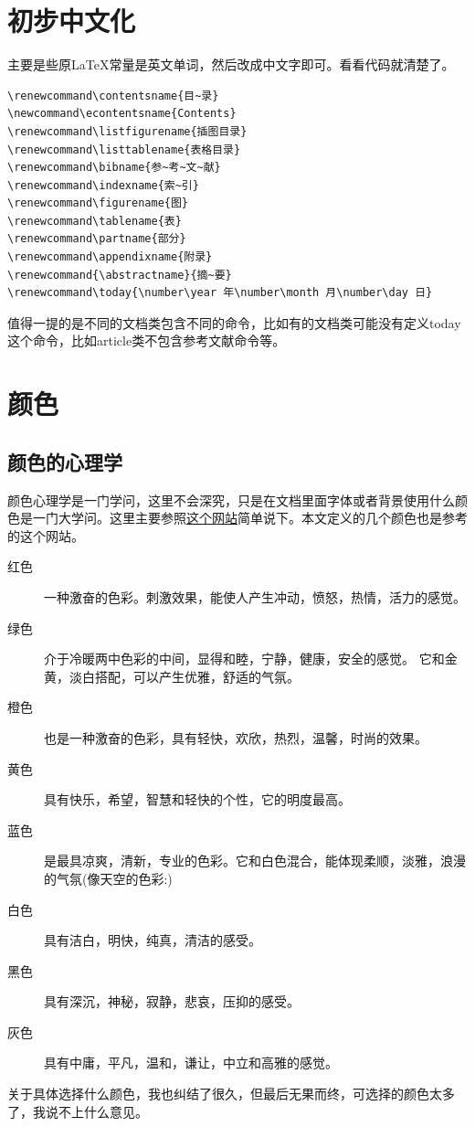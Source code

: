 \documentclass[12pt,oneside]{book}
\begin{document}
\begin{common-format}
\section{初步中文化}
主要是些原\LaTeX 常量是英文单词，然后改成中文字即可。看看代码就清楚了。
\begin{Verbatim}
\renewcommand\contentsname{目~录}
\newcommand\econtentsname{Contents}
\renewcommand\listfigurename{插图目录}
\renewcommand\listtablename{表格目录}
\renewcommand\bibname{参~考~文~献}
\renewcommand\indexname{索~引}
\renewcommand\figurename{图}
\renewcommand\tablename{表}
\renewcommand\partname{部分}
\renewcommand\appendixname{附录}
\renewcommand{\abstractname}{摘~要}
\renewcommand\today{\number\year 年\number\month 月\number\day 日}
\end{Verbatim}

值得一提的是不同的文档类包含不同的命令，比如有的文档类可能没有定义today这个命令，比如article类不包含参考文献命令等。



\section{颜色}
\label{sec:颜色}
\subsection{颜色的心理学}
颜色心理学是一门学问，这里不会深究，只是在文档里面字体或者背景使用什么颜色是一门大学问。这里主要参照\href{http://www.jb51.net/article/8216.htm}{这个网站}简单说下。本文定义的几个颜色也是参考的这个网站。

\begin{description}
\item[红色] 一种激奋的色彩。刺激效果，能使人产生冲动，愤怒，热情，活力的感觉。
\item[绿色] 介于冷暖两中色彩的中间，显得和睦，宁静，健康，安全的感觉。 它和金黄，淡白搭配，可以产生优雅，舒适的气氛。
\item[橙色] 也是一种激奋的色彩，具有轻快，欢欣，热烈，温馨，时尚的效果。
\item[黄色] 具有快乐，希望，智慧和轻快的个性，它的明度最高。 
\item[蓝色] 是最具凉爽，清新，专业的色彩。它和白色混合，能体现柔顺，淡雅，浪漫的气氛(像天空的色彩:) 
\item[白色] 具有洁白，明快，纯真，清洁的感受。 
\item[黑色] 具有深沉，神秘，寂静，悲哀，压抑的感受。 
\item[灰色] 具有中庸，平凡，温和，谦让，中立和高雅的感觉。 　　
\end{description}
关于具体选择什么颜色，我也纠结了很久，但最后无果而终，可选择的颜色太多了，我说不上什么意见。



\end{common-format}
\end{document}

